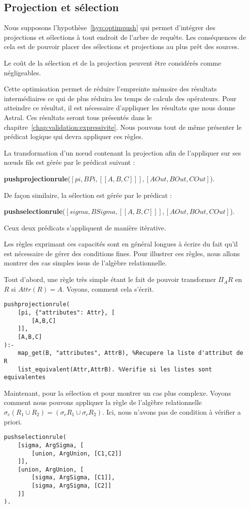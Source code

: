 \subsection{Projection et sélection}
Nous supposons l'hypothèse~\ref{hyp:optimpush} qui permet d'intégrer des projections et sélections à tout endroit de l'arbre de requête. Les conséquences de cela est de pouvoir placer des sélections et projections au plus prêt des sources. 
\begin{hyp}\label{hyp:optimpush}
    Le coût de la sélection et de la projection peuvent être considérés comme négligeables.
\end{hyp}
Cette optimisation permet de réduire l'empreinte mémoire des résultats intermédiaires ce qui de plus réduira les temps de calculs des opérateurs. Pour atteindre ce résultat, il est nécessaire d'appliquer les résultats que nous donne Astral. Ces résultats seront tous présentés dans le chapitre~\ref{chap:validation:expressivite}. Nous pouvons tout de même présenter le prédicat logique qui devra appliquer ces règles.
\begin{regle}
La transformation d'un nœud contenant la projection afin de l'appliquer sur ses nœuds fils est gérée par le prédicat suivant :
\begin{center} \textbf{pushprojectionrule}($[pi,BPi,[[A,B,C]]],[AOut,BOut,COut]$).\end{center}
De façon similaire, la sélection est gérée par le prédicat :
\begin{center} \textbf{pushselectionrule}($[sigma,BSigma,[[A,B,C]]],[AOut,BOut,COut]$).\end{center}
Ceux deux prédicats s'appliquent de manière itérative.
\end{regle}

Les règles exprimant ces capacités sont en général longues à écrire du fait qu'il est nécessaire de gérer des conditions fines. Pour illustrer ces règles, nous allons montrer des cas simples issus de l'algèbre relationnelle.
\begin{example}
	Tout d'abord, une règle très simple étant le fait de pouvoir transformer $\Pi_A R$ en $R$ si $Attr(R)=A$. Voyons, comment cela s'écrit.
	\begin{lstlisting}
pushprojectionrule(
    [pi, {"attributes": Attr}, [
        [A,B,C]
    ]],
    [A,B,C]
):-
    map_get(B, "attributes", AttrB), %Recupere la liste d'attribut de R
    list_equivalent(Attr,AttrB). %Verifie si les listes sont equivalentes
	\end{lstlisting}
	
	Maintenant, pour la sélection et pour montrer un cas plus complexe. Voyons comment nous pouvons appliquer la règle de l'algèbre relationnelle $\sigma_c (R_1 \cup R_2) = (\sigma_c R_1 \cup \sigma_c R_2)$. Ici, nous n'avons pas de condition à vérifier a priori.
	\begin{lstlisting}
pushselectionrule(
    [sigma, ArgSigma, [
        [union, ArgUnion, [C1,C2]]
    ]],
    [union, ArgUnion, [
        [sigma, ArgSigma, [C1]], 
        [sigma, ArgSigma, [C2]]
    ]]
).
	\end{lstlisting}
\end{example}

